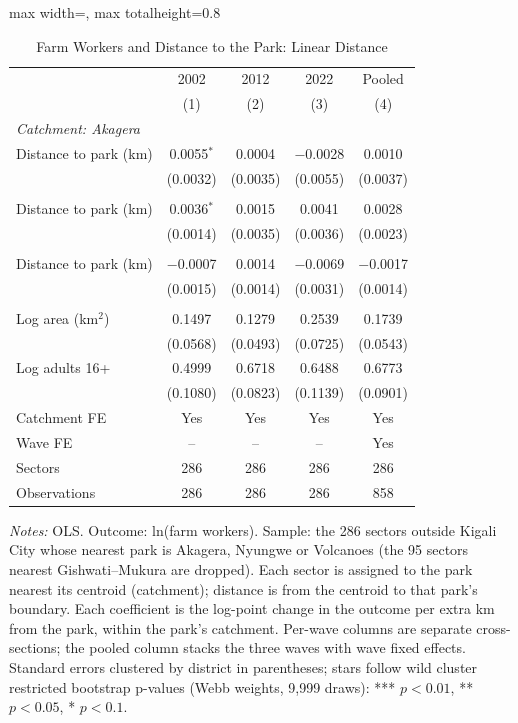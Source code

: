 \documentclass[11pt]{article}
\begin{document}
\begin{table}[H]
\centering\footnotesize\setlength{\tabcolsep}{4pt}
\caption{Farm Workers and Distance to the Park: Linear Distance}
\label{tab:main_linear_ln_farm}
\begin{adjustbox}{max width=\textwidth, max totalheight=0.8\textheight}
\begin{tabular}{lcccc}
\toprule
 & 2002 & 2012 & 2022 & Pooled \\
 & (1) & (2) & (3) & (4) \\
\midrule
\multicolumn{5}{l}{\textit{Catchment: Akagera}} \\
\quad Distance to park (km) & 0.0055$^{*}$ & 0.0004 & $-$0.0028 & 0.0010 \\
 & (0.0032) & (0.0035) & (0.0055) & (0.0037) \\
\addlinespace
\multicolumn{5}{l}{\textit{Catchment: Nyungwe}} \\
\quad Distance to park (km) & 0.0036$^{*}$ & 0.0015 & 0.0041 & 0.0028 \\
 & (0.0014) & (0.0035) & (0.0036) & (0.0023) \\
\addlinespace
\multicolumn{5}{l}{\textit{Catchment: Volcanoes}} \\
\quad Distance to park (km) & $-$0.0007 & 0.0014 & $-$0.0069 & $-$0.0017 \\
 & (0.0015) & (0.0014) & (0.0031) & (0.0014) \\
\addlinespace
\multicolumn{5}{l}{\textit{Controls}} \\
\quad Log area (km$^2$) & 0.1497 & 0.1279 & 0.2539 & 0.1739 \\
 & (0.0568) & (0.0493) & (0.0725) & (0.0543) \\
\quad Log adults 16+ & 0.4999 & 0.6718 & 0.6488 & 0.6773 \\
 & (0.1080) & (0.0823) & (0.1139) & (0.0901) \\
\midrule
Catchment FE & Yes & Yes & Yes & Yes \\
Wave FE & -- & -- & -- & Yes \\
Sectors & 286 & 286 & 286 & 286 \\
Observations & 286 & 286 & 286 & 858 \\
\bottomrule
\end{tabular}
\end{adjustbox}
\begin{minipage}{0.97\textwidth}\scriptsize
\textit{Notes:} OLS. Outcome: ln(farm workers). Sample: the 286 sectors outside Kigali City whose nearest park is Akagera, Nyungwe or Volcanoes (the 95 sectors nearest Gishwati--Mukura are dropped). Each sector is assigned to the park nearest its centroid (catchment); distance is from the centroid to that park's boundary. Each coefficient is the log-point change in the outcome per extra km from the park, within the park's catchment. Per-wave columns are separate cross-sections; the pooled column stacks the three waves with wave fixed effects. Standard errors clustered by district in parentheses; stars follow wild cluster restricted bootstrap p-values (Webb weights, 9,999 draws): *** $p<0.01$, ** $p<0.05$, * $p<0.1$.
\end{minipage}
\end{table}
\end{document}
